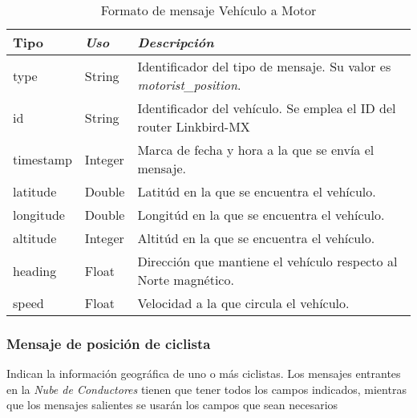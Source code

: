 \begin{table}[H]
	\centering
	\caption{Formato de mensaje Vehículo a Motor}\label{tab:CamposMensajePosVehMotNubeConductores}
	\begin{tabular}{lll}
		\toprule
			\textbf{Tipo} & \emph{Uso} & \emph{Descripción}\\
		\midrule
			type		&	String	&	Identificador del tipo de mensaje. Su valor es \emph{motorist\_position}.	\\
			id		&	String	&	Identificador del vehículo. Se emplea el ID del router Linkbird-MX		\\
			timestamp	&	Integer	&	Marca de fecha y hora a la que se envía el mensaje.					\\
			latitude	&	Double	&	Latitúd en la que se encuentra el vehículo. 						\\
			longitude	&	Double	&	Longitúd en la que se encuentra el vehículo.						\\
			altitude	&	Integer	&	Altitúd en la que se encuentra el vehículo.						\\
			heading	&	Float		&	Dirección que mantiene el vehículo respecto al Norte magnético.		\\
			speed	&	Float		&	Velocidad a la que circula el vehículo.							\\					 
		\bottomrule
	\end{tabular}
\end{table}

\subsubsection{Mensaje de posición de ciclista}\label{sssection:MensajePosCiclista}
Indican la información geográfica de uno o más ciclistas. Los mensajes entrantes en la \emph{Nube de Conductores} tienen que tener todos los campos indicados, mientras que los mensajes salientes se usarán los campos que sean necesarios

